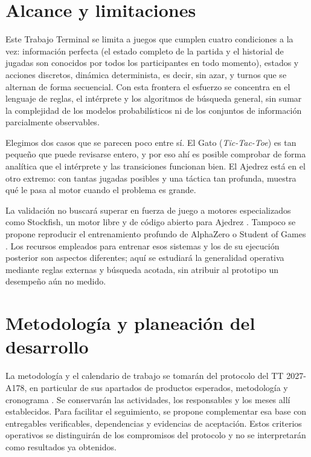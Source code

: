 \section{Alcance y limitaciones}

Este Trabajo Terminal se limita a juegos que cumplen cuatro condiciones a la vez: información perfecta (el estado completo de la partida y el historial de jugadas son conocidos por todos los participantes en todo momento), estados y acciones discretos, dinámica determinista, es decir, sin azar, y turnos que se alternan de forma secuencial. Con esta frontera el esfuerzo se concentra en el lenguaje de reglas, el intérprete y los algoritmos de búsqueda general, sin sumar la complejidad de los modelos probabilísticos ni de los conjuntos de información parcialmente observables.

Elegimos dos casos que se parecen poco entre sí. El Gato (\textit{Tic-Tac-Toe}) es tan pequeño que puede revisarse entero, y por eso ahí es posible comprobar de forma analítica que el intérprete y las transiciones funcionan bien. El Ajedrez está en el otro extremo: con tantas jugadas posibles y una táctica tan profunda, muestra qué le pasa al motor cuando el problema es grande.

La validación no buscará superar en fuerza de juego a motores especializados como Stockfish, un motor libre y de código abierto para Ajedrez \cite{StockfishOfficial}. Tampoco se propone reproducir el entrenamiento profundo de AlphaZero o Student of Games \cite{Silver2018AlphaZero, Schmid2023StudentOfGames}. Los recursos empleados para entrenar esos sistemas y los de su ejecución posterior son aspectos diferentes; aquí se estudiará la generalidad operativa mediante reglas externas y búsqueda acotada, sin atribuir al prototipo un desempeño aún no medido.

\section{Metodología y planeación del desarrollo}
\label{sec:metodologia_planeacion}

La metodología y el calendario de trabajo se tomarán del protocolo del TT 2027-A178, en particular de sus apartados de productos esperados, metodología y cronograma \cite{ProtocoloTT2027A178}. Se conservarán las actividades, los responsables y los meses allí establecidos. Para facilitar el seguimiento, se propone complementar esa base con entregables verificables, dependencias y evidencias de aceptación. Estos criterios operativos se distinguirán de los compromisos del protocolo y no se interpretarán como resultados ya obtenidos.

